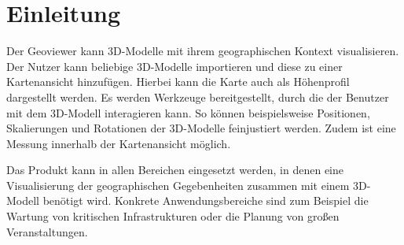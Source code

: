 \chapter{Einleitung}

Der Geoviewer kann 3D-Modelle mit ihrem geographischen Kontext visualisieren. Der Nutzer kann beliebige 3D-Modelle importieren und diese zu einer Kartenansicht hinzufügen. Hierbei kann die Karte auch als Höhenprofil dargestellt werden. Es werden
Werkzeuge bereitgestellt, durch die der Benutzer mit dem 3D-Modell interagieren kann. So können beispielsweise Positionen, Skalierungen und Rotationen der 3D-Modelle feinjustiert werden. Zudem ist eine Messung innerhalb der Kartenansicht
möglich. 

Das Produkt kann in allen Bereichen eingesetzt werden, in denen eine Visualisierung der geographischen Gegebenheiten zusammen mit einem 3D-Modell benötigt
wird. Konkrete Anwendungsbereiche sind zum Beispiel die Wartung von kritischen
Infrastrukturen oder die Planung von großen Veranstaltungen.